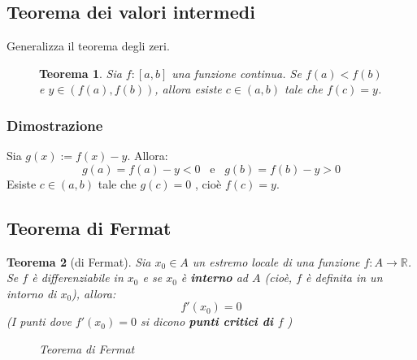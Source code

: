 \documentclass[a4paper]{article}
\newtheorem{theorem}{Teorema}
\theoremstyle{break}
\theoremstyle{break}
\theoremstyle{break}
\theoremstyle{break}
\begin{document}
\subsection{Teorema dei valori intermedi}
Generalizza il teorema degli zeri.
\begin{figure}[H]
  \begin{theorem}
    Sia \( f: [a,b] \) una funzione continua. Se \( f(a) < f(b) \) e \( y \in (f(a),f(b)) \), allora esiste
    \( c \in (a,b) \) tale che \( f(c) = y \).
  \end{theorem}
\end{figure}

\subsubsection{Dimostrazione}
Sia \( g(x) := f(x) - y \). Allora:
\[
  g(a) = f(a) - y < 0 \;\;\; \text{e} \;\;\; g(b) = f(b) - y > 0
\] 
Esiste \( c \in (a,b) \) tale che \( g(c) = 0 \) , cioè \( f(c) = y \).

\subsection{Teorema di Fermat}
\begin{theorem}[di Fermat]
  Sia \( x_0 \in A \) un estremo locale di una funzione \( f: A \to \mathbb{R} \).
  Se \( f \) è differenziabile in \( x_0 \) e se \( x_0 \) è \textbf{interno} ad \( A \)
  (cioè, \( f \) è definita in un intorno di \( x_0 \)), allora:
  \[
    f'(x_0)=0
  \] 
  (I punti dove \( f'(x_0)=0 \) si dicono \textbf{punti critici di \( f \) })
  \begin{figure}[H]
    \begin{center}
    \end{center}
    \caption{Teorema di Fermat}
  \end{figure}
\end{theorem}
\end{document}
